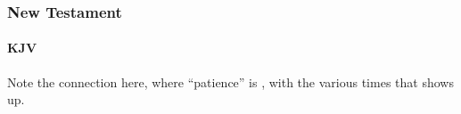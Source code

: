 			
		
		
	\subsubsection{New Testament} %
		\label{PATIENCE-NT}
	
		\paragraph{KJV}
			\label{PATIENCE-NT-KJV}		
	
			
			\begin{compactdesc}
				\item[{\hyperref[ROMANS-5-3]{Romans 5:3--4}}] \phantom{.}
					\begin{compactitem}
						\item Note the connection here, where ``patience'' is , with the various times that \hyperref[HUPOMENO]{} shows up.
					\end{compactitem}
			\end{compactdesc}
			
		
				
				
